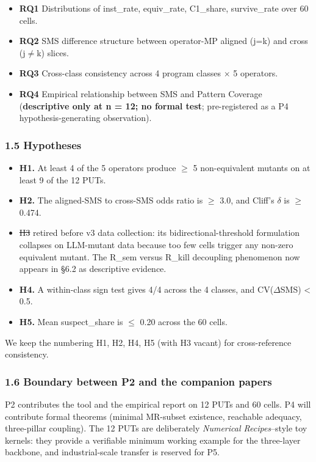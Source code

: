 \documentclass[review,12pt,authoryear]{elsarticle}
\providecommand{\tightlist}{\setlength{\itemsep}{0pt}\setlength{\parskip}{0pt}}
\providecommand{\st}[1]{\sout{#1}} %
\begin{document}
\begin{itemize}
\tightlist
\item
  \textbf{RQ1} Distributions of inst\_rate, equiv\_rate, C1\_share,
  survive\_rate over 60 cells.
\item
  \textbf{RQ2} SMS difference structure between operator-MP aligned
  (j=k) and cross (j$\neq$k) slices.
\item
  \textbf{RQ3} Cross-class consistency across 4 program classes $\times$ 5
  operators.
\item
  \textbf{RQ4} Empirical relationship between SMS and Pattern Coverage
  (\textbf{descriptive only at n = 12; no formal test}; pre-registered
  as a P4 hypothesis-generating observation).
\end{itemize}

\subsubsection{1.5 Hypotheses}\label{hypotheses}

\begin{itemize}
\tightlist
\item
  \textbf{H1.} At least 4 of the 5 operators produce $\geq$ 5 non-equivalent
  mutants on at least 9 of the 12 PUTs.
\item
  \textbf{H2.} The aligned-SMS to cross-SMS odds ratio is $\geq$ 3.0, and
  Cliff's $\delta$ is $\geq$ 0.474.
\item
  \st{H3} retired before v3 data collection: its bidirectional-threshold
  formulation collapses on LLM-mutant data because too few cells trigger
  any non-zero equivalent mutant. The R\_sem versus R\_kill decoupling
  phenomenon now appears in §6.2 as descriptive evidence.
\item
  \textbf{H4.} A within-class sign test gives 4/4 across the 4 classes,
  and CV($\Delta$SMS) \textless{} 0.5.
\item
  \textbf{H5.} Mean suspect\_share is $\leq$ 0.20 across the 60 cells.
\end{itemize}

We keep the numbering H1, H2, H4, H5 (with H3 vacant) for
cross-reference consistency.

\subsubsection{1.6 Boundary between P2 and the companion
papers}\label{boundary-between-p2-and-the-companion-papers}

P2 contributes the tool and the empirical report on 12 PUTs and 60
cells. P4 will contribute formal theorems (minimal MR-subset existence,
reachable adequacy, three-pillar coupling). The 12 PUTs are deliberately
\emph{Numerical Recipes}--style toy kernels: they provide a verifiable
minimum working example for the three-layer backbone, and
industrial-scale transfer is reserved for P5.
\end{document}
